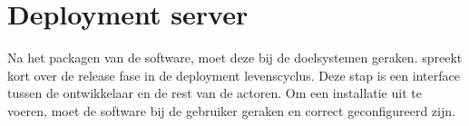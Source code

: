 \section{Deployment server}
Na het packagen van de software, moet deze bij de doelsystemen geraken.
\citet{softwareDeployment} spreekt kort over de release fase in de deployment levenscyclus.
Deze stap is een interface tussen de ontwikkelaar en de rest van de actoren.
Om een installatie uit te voeren, moet de software bij de gebruiker geraken en correct geconfigureerd zijn.

